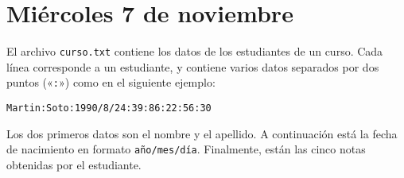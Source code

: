 \documentclass[12pt,spanish]{article}
\begin{document}
  \thispagestyle{empty}
  \section*{Miércoles 7 de noviembre}

  El archivo \texttt{curso.txt} contiene los datos
  de los estudiantes de un curso.
  Cada línea corres\-ponde a un estudiante,
  y contiene varios datos separados por dos puntos («\verb+:+»)
  como en el siguiente ejemplo:
  \begin{verbatim}Martin:Soto:1990/8/24:39:86:22:56:30\end{verbatim}

  Los dos primeros datos son el nombre y el apellido.
  A continuación está la fecha de nacimiento
  en formato \texttt{año/mes/día}.
  Finalmente, están las cinco notas obtenidas por el estudiante.
\end{document}
